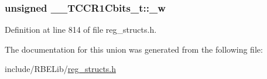 \hypertarget{union_____t_c_c_r1_cbits__t_a18051e4f4d67e6d511d1e176f80a8b54}{
\subsubsection[{\+\_\+w}]{\setlength{\rightskip}{0pt plus 5cm}unsigned \+\_\+\+\_\+\+T\+C\+C\+R1\+Cbits\+\_\+t\+::\+\_\+w}}\label{union_____t_c_c_r1_cbits__t_a18051e4f4d67e6d511d1e176f80a8b54}


Definition at line 814 of file reg\+\_\+structs.\+h.



The documentation for this union was generated from the following file\+:\begin{DoxyCompactItemize}
\item 
include/\+R\+B\+E\+Lib/\hyperlink{reg__structs_8h}{reg\+\_\+structs.\+h}\end{DoxyCompactItemize}
